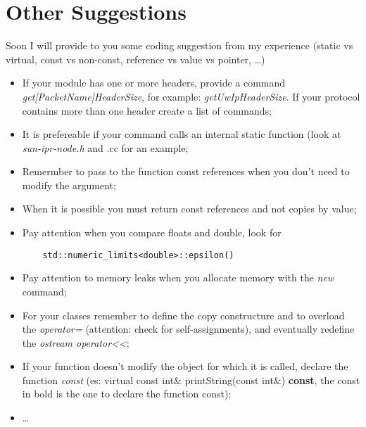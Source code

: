 \documentclass[12pt]{article}
\begin{document}
\section*{Other Suggestions}
Soon I will provide to you some coding suggestion from my experience (static vs virtual, const vs non-const, reference vs value vs pointer, \ldots)
\begin{itemize}
	\item If your module has one or more headers, provide a command \emph{get[PacketName]HeaderSize}, for example: \emph{getUwIpHeaderSize}. If your protocol contains more than one header create a list of commands;
	\item It is prefereable if your command calls an internal static function (look at \emph{sun-ipr-node.h} and .cc for an example;
	\item Remermber to pass to the function const references when you don't need to modify the argument;
	\item When it is possible you must return const references and not copies by value;
	\item Pay attention when you compare floats and double, look for
	\begin{lstlisting}
	std::numeric_limits<double>::epsilon()
	\end{lstlisting}
	\item Pay attention to memory leaks when you allocate memory with the \emph{new} command;
	\item For your classes remember to define the copy constructure and to overload the \emph{operator=} (attention: check for self-assignments), and eventually redefine the \emph{ostream operator\textless\textless};
	\item If your function doesn't modify the object for which it is called, declare the function \emph{const}
	(es: virtual const int\& printString(const int\&) \textbf{const}, the const in bold is the one to declare the function const);
	\item \ldots
	
	
	\end{itemize}
	
\end{document}
